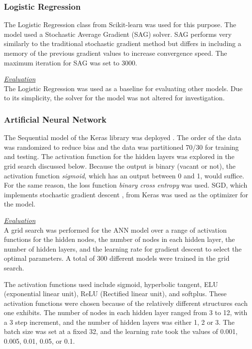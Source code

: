 \documentclass[letterpaper, 12 pt, conference]{ieeeconf}  %
\begin{document}
\subsubsection{Logistic Regression}
\mbox{} %

The Logistic Regression class from Scikit-learn was used for this purpose. The model used a Stochastic Average Gradient (SAG) solver. SAG performs very similarly to the traditional stochastic gradient method but differs in including a memory of the previous gradient values to increase convergence speed. The maximum iteration for SAG was set to 3000.

\textit{\underline{Evaluation}}\\
The Logistic Regression was used as a baseline for evaluating other models. Due to its simplicity, the solver for the model was not altered for investigation.

\subsubsection{Artificial Neural Network}
\mbox{} %

The Sequential model of the Keras library was deployed \cite{Keras, Google}. The order of the data was randomized to reduce bias and the data was partitioned 70/30 for training and testing. The activation function for the hidden layers was explored in the grid search discussed below. Because the output is binary (vacant or not), the activation function \textit{sigmoid}, which has an output between 0 and 1, would suffice. For the same reason, the loss function \textit{binary cross entropy} was used. SGD, which implements stochastic gradient descent \cite{Bottou}, from Keras was used as the optimizer for the model.

\textit{\underline{Evaluation}} \\
A grid search was performed for the ANN model over a range of activation functions for the hidden nodes, the number of nodes in each hidden layer, the number of hidden layers, and the learning rate for gradient descent to select the optimal parameters. A total of 300 different models were trained in the grid search.

The activation functions used include sigmoid, hyperbolic tangent, ELU (exponential linear unit), ReLU (Rectified linear unit), and softplus. These activation functions were chosen because of the relatively different structures each one exhibits. The number of nodes in each hidden layer ranged from 3 to 12, with a 3 step increment, and the number of hidden layers was either 1, 2 or 3. The batch size was set at a fixed 32, and the learning rate took the values of 0.001, 0.005, 0.01, 0.05, or 0.1.
\end{document}
